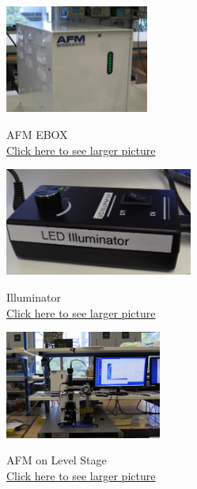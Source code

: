 \documentclass{../lab}
\begin{document}
\begin{figure}[H]
\captionsetup{justification=centering}
  \href{http://experimentationlab.berkeley.edu/sites/default/files/AFMImages/9.JPG}{\includegraphics[height=100pt,keepaspectratio]{images/9.JPG}}
\caption{AFM EBOX\\ \href{http://experimentationlab.berkeley.edu/sites/default/files/AFMImages/9.JPG}{Click here to see larger picture}}
  \label{fig:AFMEBox}
\endminipage\hfill
{}
  \href{http://experimentationlab.berkeley.edu/sites/default/files/AFMImages/LED2.jpg}{\includegraphics[height=100pt,keepaspectratio]{images/LED2.jpg}}
  \caption{Illuminator \\ \href{http://experimentationlab.berkeley.edu/sites/default/files/AFMImages/LED2.jpg}{Click here to see larger picture}}
  \label{fig:Illuminator}
\endminipage\hfill
{}
  \href{http://experimentationlab.berkeley.edu/sites/default/files/AFMImages/AFMstation.jpg}{\includegraphics[height=100pt,keepaspectratio]{images/AFMstation.jpg}}
  \caption{AFM on Level Stage \\ \href{http://experimentationlab.berkeley.edu/sites/default/files/AFMImages/AFMstation.jpg}{Click here to see larger picture}}
  \label{fig:LevelStage}
\endminipage
\end{figure}
\end{document}
